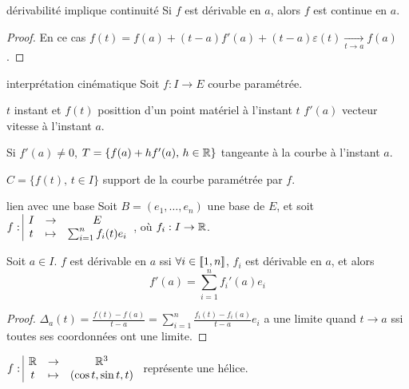 \documentclass{prepacours}
\begin{document}
\begin{corollaire}{dérivabilité implique continuité}{}
    Si $f$ est dérivable en $a$, alors $f$ est continue en $a$.
\end{corollaire}

\begin{proof}
    En ce cas $f(t) = f(a) + (t-a)f'(a) + (t-a)\varepsilon(t) \xrightarrow[t \to a]{} f(a)$.
\end{proof}


\begin{definition}{interprétation cinématique}{}
    Soit $f : I \to E$ courbe paramétrée. 
    
    $t$ instant et $f(t)$ posittion d'un point matériel à l'instant 
    $t$ $f'(a)$ vecteur vitesse à l'instant $a$. 

    Si $f'(a) \neq 0$, $T = \{ f(a) + hf'(a), \, h \in \mathbb{R}\}$ tangeante à la courbe à l'instant 
    $a$. 

    $C = \{ f(t), \, t \in I\}$ support de la courbe paramétrée par $f$. 
\end{definition}

\begin{proposition}{lien avec une base }{}
    Soit $B = (e_1, \ldots, e_n)$ une base de $E$, et soit 
    $\displaystyle f: \space \begin{array}{|ccc} I & \to & E \\ t & \mapsto & \sum_{i=1}^n f_i(t)e_i \end{array}$, où $f_i : I \to \mathbb{R}$.

    Soit $a \in I$. $f$ est dérivable en $a$ ssi $\forall i \in [\![1, n]\!]$, $f_i$
    est dérivable en $a$, et alors 
    $$f'(a) = \sum_{i=1}^n f_i'(a)e_i$$
\end{proposition}

\begin{proof}
    $\Delta_a(t) = \displaystyle \frac{f(t) - f(a)}{t-a} = \sum_{i=1}^n \frac{f_i(t) - f_i(a)}{t-a}e_i$ a 
    une limite quand $t \to a $ ssi toutes ses coordonnées ont une limite.
\end{proof}

\begin{exemple}
    $f: \space \begin{array}{|ccc} \mathbb{R} & \to & \mathbb{R}^3 \\ t & \mapsto & (\cos t, \sin t, t) \end{array}$ représente une hélice.
\end{exemple}
\end{document}
